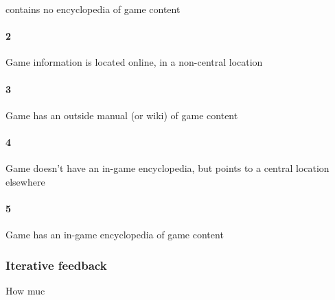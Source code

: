  contains no encyclopedia of game content\paragraph{2}Game information is located online, in a non-central location\paragraph{3}Game has an outside manual (or wiki) of game content\paragraph{4}Game doesn't have an in-game encyclopedia, but points to a central location elsewhere\paragraph{5}Game has an in-game encyclopedia of game content\subsubsection{Iterative feedback}How muc
